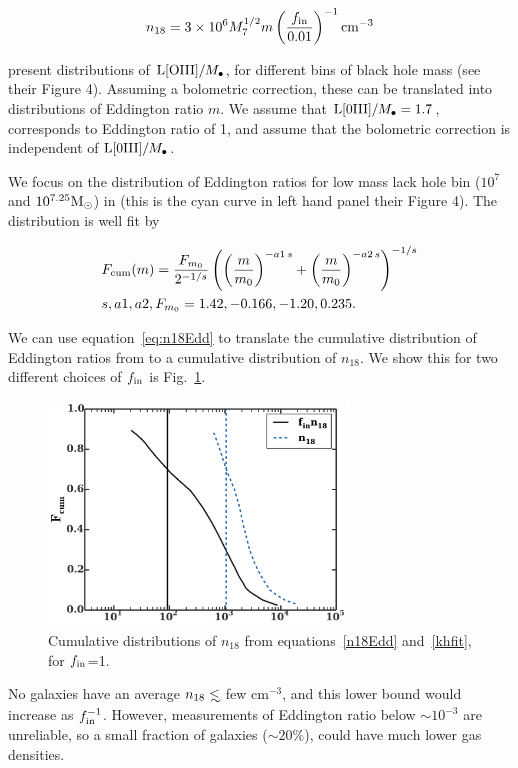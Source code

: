 \documentclass[usenatbib,fleqn]{mnras}
\newcommand\lsim{\mathrel{\rlap{\lower4pt\hbox{\hskip1pt$\sim$}}
    \raise1pt\hbox{$<$}}}
\newcommand{\Mbh}[1][]{M_{\bullet#1}}
\newcommand{\Msun}{{\rm M_\odot}}
\begin{document}
\begin{equation}
n_{18} = 3 \times 10^6 M_7^{1/2} m \left(\frac{f_{\rm in}}{0.01}\right)^{-1} {\rm
  cm}^{-3}
\label{eq:n18Edd}
\end{equation}

\citet{Kauffmann+2009} present distributions of
${\rm L[OIII]}/\Mbh$, for different bins of black hole mass (see their
Figure 4).  Assuming a bolometric correction, these can be translated
into distributions of Eddington ratio $m$. We assume that ${\rm
  L[0III]}/\Mbh=1.7$, corresponds to Eddington ratio of 1, and assume
that the bolometric correction is independent of ${\rm
  L[0III]}/\Mbh$.

We focus on the distribution of Eddington ratios for low mass lack
hole bin ($10^7$ and $10^{7.25} \Msun$) in \citet{Kauffmann+2009}
(this is the cyan curve in left hand panel their Figure 4). The
distribution is well fit by

\begin{align}
  &F_{\rm cum}(m)=\frac{F_{m_0}}{2^{-1/s}}
  \left(\left(\frac{m}{m_0}\right)^{-a1\,
      s}+\left(\frac{m}{m_0}\right)^{-a2 \, s}\right)^{-1/s} \label{khFit}\\
  &s, a1, a2, F_{m_0}=1.42, -0.166, -1.20, 0.235.\nonumber
\end{align}

We can use equation~\eqref{eq:n18Edd} to translate the cumulative
distribution of Eddington ratios from \citet{Kauffmann+2009}  to a cumulative
distribution of $n_{18}$. We show this for two different choices of
$f_{\rm in}$ is Fig.~\ref{n18Cum}.

\begin{figure}
\includegraphics[width=8cm]{fcum_n18.pdf}
\caption{\label{n18Cum} Cumulative distributions of $n_{18}$ from
  equations~\eqref{n18Edd} and~\eqref{khfit}, for $f_{\rm in}$=1.} 
\end{figure}

No galaxies have an average $n_{18} \lsim$ few cm$^{-3}$, and this
lower bound would increase as $f_{\rm in}^{-1}$. However, measurements
of Eddington ratio below $\sim 10^{-3}$ are unreliable, so a small
fraction of galaxies ($\sim 20\%$), could have much lower gas
densities.
\end{document}
